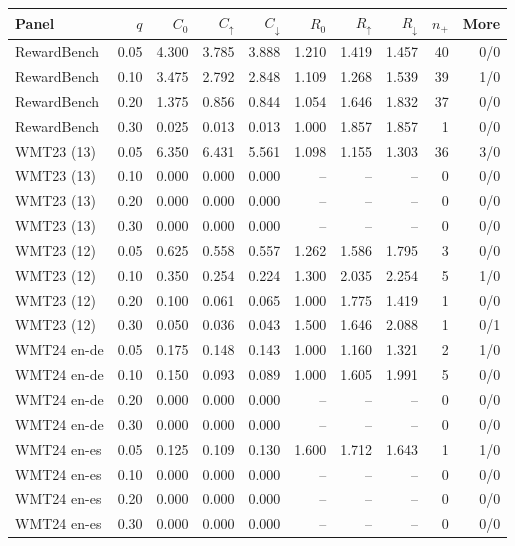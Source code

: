 \begin{table}[t]
\centering\small
\begin{tabular}{lrrrrrrrrr}
\toprule
Panel & $q$ & $C_0$ & $C_\uparrow$ & $C_\downarrow$ & $R_0$ & $R_\uparrow$ & $R_\downarrow$ & $n_+$ & More \\
\midrule
RewardBench & 0.05 & 4.300 & 3.785 & 3.888 & 1.210 & 1.419 & 1.457 & 40 & 0/0 \\
RewardBench & 0.10 & 3.475 & 2.792 & 2.848 & 1.109 & 1.268 & 1.539 & 39 & 1/0 \\
RewardBench & 0.20 & 1.375 & 0.856 & 0.844 & 1.054 & 1.646 & 1.832 & 37 & 0/0 \\
RewardBench & 0.30 & 0.025 & 0.013 & 0.013 & 1.000 & 1.857 & 1.857 & 1 & 0/0 \\
WMT23 (13) & 0.05 & 6.350 & 6.431 & 5.561 & 1.098 & 1.155 & 1.303 & 36 & 3/0 \\
WMT23 (13) & 0.10 & 0.000 & 0.000 & 0.000 & -- & -- & -- & 0 & 0/0 \\
WMT23 (13) & 0.20 & 0.000 & 0.000 & 0.000 & -- & -- & -- & 0 & 0/0 \\
WMT23 (13) & 0.30 & 0.000 & 0.000 & 0.000 & -- & -- & -- & 0 & 0/0 \\
WMT23 (12) & 0.05 & 0.625 & 0.558 & 0.557 & 1.262 & 1.586 & 1.795 & 3 & 0/0 \\
WMT23 (12) & 0.10 & 0.350 & 0.254 & 0.224 & 1.300 & 2.035 & 2.254 & 5 & 1/0 \\
WMT23 (12) & 0.20 & 0.100 & 0.061 & 0.065 & 1.000 & 1.775 & 1.419 & 1 & 0/0 \\
WMT23 (12) & 0.30 & 0.050 & 0.036 & 0.043 & 1.500 & 1.646 & 2.088 & 1 & 0/1 \\
WMT24 en-de & 0.05 & 0.175 & 0.148 & 0.143 & 1.000 & 1.160 & 1.321 & 2 & 1/0 \\
WMT24 en-de & 0.10 & 0.150 & 0.093 & 0.089 & 1.000 & 1.605 & 1.991 & 5 & 0/0 \\
WMT24 en-de & 0.20 & 0.000 & 0.000 & 0.000 & -- & -- & -- & 0 & 0/0 \\
WMT24 en-de & 0.30 & 0.000 & 0.000 & 0.000 & -- & -- & -- & 0 & 0/0 \\
WMT24 en-es & 0.05 & 0.125 & 0.109 & 0.130 & 1.600 & 1.712 & 1.643 & 1 & 1/0 \\
WMT24 en-es & 0.10 & 0.000 & 0.000 & 0.000 & -- & -- & -- & 0 & 0/0 \\
WMT24 en-es & 0.20 & 0.000 & 0.000 & 0.000 & -- & -- & -- & 0 & 0/0 \\
WMT24 en-es & 0.30 & 0.000 & 0.000 & 0.000 & -- & -- & -- & 0 & 0/0 \\

\end{tabular}
\end{table}
